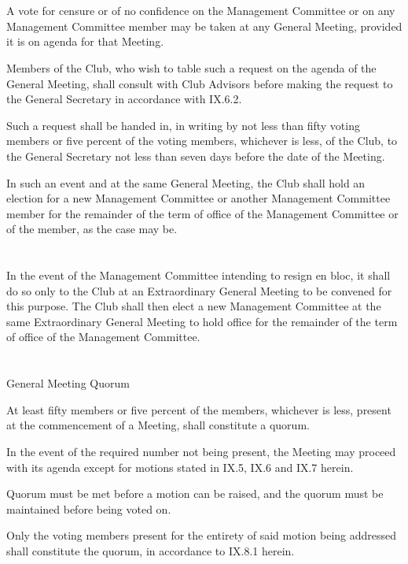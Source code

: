 \section{}
A vote for censure or of no confidence on the Management Committee or on any Management Committee member may be taken at any General Meeting, provided it is on agenda for that Meeting.
\begin{legal}
	\item Members of the Club, who wish to table such a request on the agenda of the General Meeting, shall consult with Club Advisors before making the request to the General Secretary in accordance with IX.6.2.
	\item Such a request shall be handed in, in writing by not less than fifty voting members or five percent of the voting members, whichever is less, of the Club, to the General Secretary not less than seven days before the date of the Meeting.
	\item In such an event and at the same General Meeting, the Club shall hold an election for a new Management Committee or another Management Committee member for the remainder of the term of office of the Management Committee or of the member, as the case may be.
	\end{legal}

\section{}
In the event of the Management Committee intending to resign en bloc, it shall do so only to the Club at an Extraordinary General Meeting to be convened for this purpose. The Club shall then elect a new Management Committee at the same Extraordinary General Meeting to hold office for the remainder of the term of office of the Management Committee.

\section{}
General Meeting Quorum
	\begin{legal}
	\item At least fifty members or five percent of the members, whichever is less, present at the commencement of a Meeting, shall constitute a quorum.
	\item In the event of the required number not being present, the Meeting may proceed with its agenda except for motions stated in IX.5, IX.6 and IX.7 herein.
	\item Quorum must be met before a motion can be raised, and the quorum must be maintained before being voted on.
		\begin{legal}
		\item Only the voting members present for the entirety of said motion being addressed shall constitute the quorum, in accordance to IX.8.1 herein.
		\end{legal}
	\end{legal}

